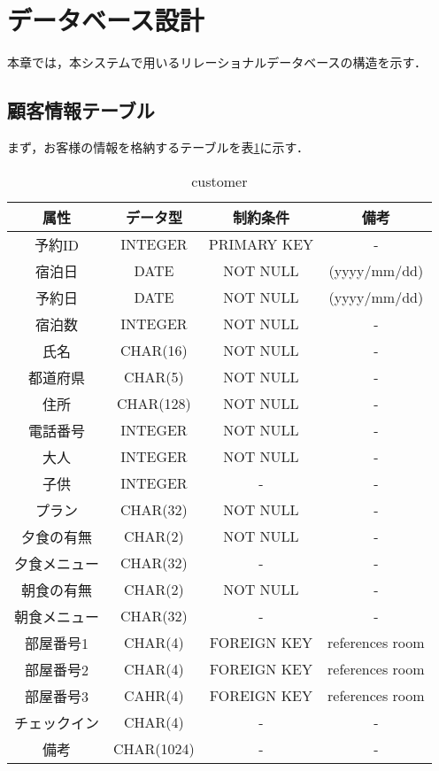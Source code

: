 \section{データベース設計}

本章では，本システムで用いるリレーショナルデータベースの構造を示す．

\subsection{顧客情報テーブル}
まず，お客様の情報を格納するテーブルを表\ref{fig:data_cus}に示す．
\begin{table}
    \begin{center}
    \begin{tabular}{|c|c|c|c|}
        \hline
        属性       & データ型      &  制約条件     & 備考 \\ \hline \hline
        予約ID     & INTEGER       & PRIMARY KEY  &  - \\ \hline
        宿泊日     & DATE          &   NOT NULL   &   (yyyy/mm/dd) \\ \hline
        予約日     & DATE          &   NOT NULL   &   (yyyy/mm/dd) \\ \hline
        宿泊数     & INTEGER       &   NOT NULL    &  - \\ \hline 
        氏名       & CHAR(16)      &   NOT NULL    &  -  \\\hline
        都道府県   & CHAR(5)       &   NOT NULL     & - \\ \hline
        住所       & CHAR(128)     & NOT NULL      & - \\  \hline
        電話番号   & INTEGER       & NOT NULL       & - \\   \hline
        大人       & INTEGER       & NOT NULL       & - \\   \hline
        子供       & INTEGER       & -             & - \\ \hline      
        プラン     & CHAR(32)      & NOT NULL      & - \\  \hline 
        夕食の有無 & CHAR(2)       & NOT NULL       & -  \\ \hline
        夕食メニュー   & CHAR(32)      & -             & -  \\ \hline
        朝食の有無 & CHAR(2)       & NOT NULL       & -  \\ \hline
        朝食メニュー   & CHAR(32)      & -             & -  \\ \hline
        部屋番号1  & CHAR(4)       & FOREIGN KEY   & references room \\ \hline
        部屋番号2  & CHAR(4)      & FOREIGN KEY   & references room \\ \hline
        部屋番号3  & CAHR(4)       & FOREIGN KEY   & references room \\ \hline
        チェックイン & CHAR(4)    & -             & -  \\ \hline
        備考 & CHAR(1024)    & -             & -  \\ \hline
        \end{tabular}
        \label{fig:data_cus} 
        \caption{customer}
    \end{center}
    \end{table}

